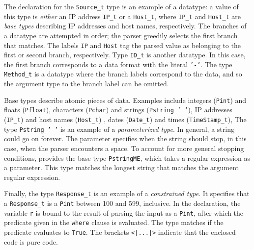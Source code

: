 \documentclass{sig-alternate}
\begin{document}
The declaration for the \texttt{Source\_t} type is an example of a
datatype: a value of this type is \textit{either} an IP address
\texttt{IP\_t} or a \texttt{Host\_t}, where \texttt{IP\_t} and
\texttt{Host\_t} are \pads{} \textit{base types} describing IP
addresses and host names, respectively.  The branches of a datatype
are attempted in order; the parser greedily selects the first branch
that matches.   The labels \texttt{IP} and \texttt{Host} tag the
parsed value as belonging to the first or second branch, respectively.
Type \texttt{ID\_t} is another datatype. In this case, the first
branch corresponds to a data format with the literal \texttt{'-'}. The
type \texttt{Method\_t} is a datatype where the branch labels
correspond to the data, and so the argument type to the branch label
can be omitted.  

Base types describe atomic pieces of data.  Examples include integers
(\texttt{Pint}) and floats (\texttt{Pfloat}), characters
(\texttt{Pchar}) and strings (\texttt{Pstring ' '}), IP addresses
(\texttt{IP\_t}) and host names (\texttt{Host\_t}) , dates
(\texttt{Date\_t}) and times (\texttt{TimeStamp\_t}), \etc{} The type
\texttt{Pstring ' '} is an example of a \textit{parameterized type}.
In general, a string could go on forever.  The parameter specifies
when the string should stop, in this case, when the parser encounters
a space.  To account for more general stopping conditions,
\padshaskell{} provides the base type \texttt{PstringME}, which takes
a regular expression as a parameter.  This type matches the longest
string that matches the argument regular expression.

Finally, the type \texttt{Response\_t} is an example of a
\textit{constrained type}. It specifies that a \texttt{Response\_t} is
a \texttt{Pint} between 100 and 599, inclusive. In the declaration,
the variable \texttt{r} is bound to the result of parsing the input as
a \texttt{Pint}, after which the predicate given in the \texttt{where}
clause is evaluated. The type matches if the predicate evaluates to
\texttt{True}.  The brackets \texttt{<|...|>} indicate that
the enclosed code is pure \haskell{} code.
\end{document}

